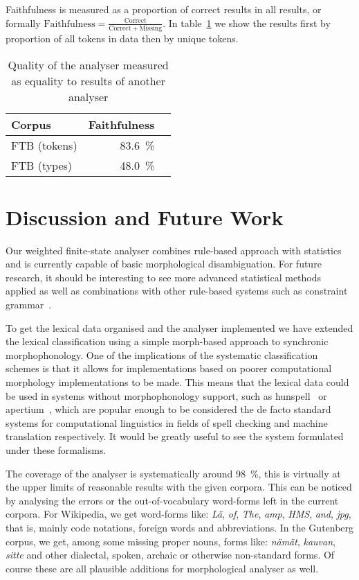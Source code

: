 \documentclass[a4paper,12pt]{article}
\begin{document}
Faithfulness is measured as a proportion of correct results in all results, or
formally $\mathrm{Faithfulness} = \frac{\mathrm{Correct}}{\mathrm{Correct} +
\mathrm{Missing}}$. In table~\ref{table:quality} we show the results first
by proportion of all tokens in data then by unique tokens.

\begin{table}
    \begin{scriptsize}
    \centering
    \begin{tabular}{|l|r|r|}
        \hline
        \bf Corpus & \bf Faithfulness \\
        \hline
        FTB (tokens) & 83.6~\% \\
        FTB (types)  & 48.0~\% \\
        \hline
    \end{tabular}
    \caption{Quality of the analyser measured as equality to results of
        another analyser \label{table:quality}}
  \end{scriptsize}
\end{table}

\section{Discussion and Future Work}
\label{sec:discussion}

Our weighted finite-state analyser combines rule-based approach with statistics
and is currently capable of basic morphological disambiguation.  For future
research, it should be interesting to see more advanced statistical methods
applied as well as combinations with other rule-based systems such as
constraint grammar~\citep{karlsson1995constraint}.

To get the lexical data organised and the analyser implemented we have extended
the lexical classification using a simple morph-based approach to synchronic
morphophonology.  One of the implications of the systematic classification
schemes is that it allows for implementations based on poorer computational
morphology implementations to be made. This means that the lexical data could
be used in systems without morphophonology support, such as
hunspell~\citep{tron2005hunmorph} or apertium~\citep{apertium}, which are
popular enough to be considered the de facto standard systems for computational
linguistics in fields of spell checking and machine translation respectively.
It would be greatly useful to see the system formulated under these formalisms.

The coverage of the analyser is systematically around 98~\%, this is virtually
at the upper limits of reasonable results with the given corpora. This can be
noticed by analysing the errors or the out-of-vocabulary word-forms left in the
current corpora. For Wikipedia, we get word-forms like: \emph{Lä}, \emph{of},
\emph{The}, \emph{amp}, \emph{HMS}, \emph{and}, \emph{jpg}, that is, mainly
code notations, foreign words and abbreviations. In the Gutenberg corpus, we
get, among some missing proper nouns, forms like: \emph{nämät}, \emph{kauvan},
\emph{sitte} and other dialectal, spoken, archaic or otherwise non-standard
forms. Of course these are all plausible additions for morphological analyser
as well.
\end{document}
